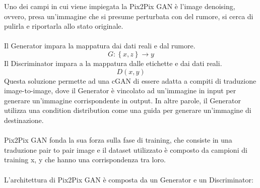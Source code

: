         Uno dei campi in cui viene impiegata la Pix2Pix GAN è l'image denoising, ovvero, presa un'immagine che si presume perturbata con del rumore, si cerca di pulirla e riportarla allo stato originale.\\\\
        Il Generator impara la mappatura dai dati reali e dal rumore.
            \begin{equation*}
                G:\left \{ x, z \right \} \rightarrow y
            \end{equation*}
        Il Discriminator impara a la mappatura dalle etichette e dai dati reali.
            \begin{equation*}
                D(x, y)
            \end{equation*}
        Questa soluzione permette ad una cGAN di essere adatta a compiti di traduzione image-to-image, dove il Generator è vincolato ad un'immagine in input per generare un'immagine corrispondente in output. In altre parole, il Generator utilizza una condition distribution come una guida per generare un'immagine di destinazione. \\\\
        Pix2Pix GAN fonda la sua forza sulla fase di training, che consiste in una traduzione pair to pair image e il dataset utilizzato è composto da campioni di training {x, y} che hanno una corrispondenza tra loro. \\\\
        L'architettura di Pix2Pix GAN è composta da un Generator e un Discriminator:
